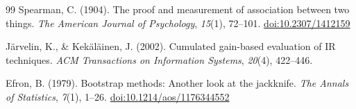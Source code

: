 \begin{thebibliography}{99}
 Spearman, C. (1904). The proof and measurement of association between two things. \textit{The American Journal of Psychology}, \textit{15}(1), 72--101. \href{https://doi.org/10.2307/1412159}{doi:10.2307/1412159}

 J\"{a}rvelin, K., \& Kek\"{a}l\"{a}inen, J. (2002). Cumulated gain-based evaluation of IR techniques. \textit{ACM Transactions on Information Systems}, \textit{20}(4), 422--446.

 Efron, B. (1979). Bootstrap methods: Another look at the jackknife. \textit{The Annals of Statistics}, \textit{7}(1), 1--26. \href{https://doi.org/10.1214/aos/1176344552}{doi:10.1214/aos/1176344552}

\end{thebibliography}
\endgroup
